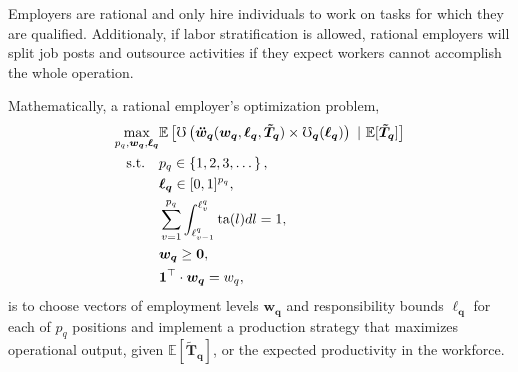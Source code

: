 \documentclass[hidelinks, nonatbib]{elsarticle}
\begin{document}
\begin{axiom}
    \label{era}
    Employers are rational and only hire individuals to work on tasks for which they are qualified. Additionaly, if labor stratification is allowed, rational employers will split job posts and outsource activities if they expect workers cannot accomplish the whole operation.

    Mathematically, a rational employer's optimization problem,
    \begin{align}
        \max_{
            p_q,
            \boldsymbol{w_q},
            \boldsymbol{\ell_q}
        }
            &
            \mathbb{E}\left[
                \mho\left(
                    \boldsymbol{\ddot{w}_{q}}(
                        \boldsymbol{w_{q}},
                        \boldsymbol{\ell_{q}},
                        \boldsymbol{\tilde{T}_{q}}
                    )
                    \times
                    \boldsymbol{
                        \mho_q
                    }(
                        \boldsymbol{\ell_q}
                    )
                \right)
                \
                |
                \
                \mathbb{E}[
                    \boldsymbol{\tilde{T}_q}
                ]
            \right]
            \\
            \text{s.t.}
            \quad
            &
            p_q \in \left\{1, 2, 3, \dots\right\}
            ,
            \\
            &
            \boldsymbol{\ell_q} \in [0,1] ^ {p_q}
            ,
            \\
            &
            \sum_{v=1}^{p_q}{
                \int_{
                    \ell_{v-1}^{q}
                }^{
                    \ell_{v}^{q}
                }
                \text{ta}(l)dl
            }
            =
            1
            ,
            \\
            &
            \boldsymbol{w_{q}} \geq \boldsymbol{0}
            ,
            \\
            &
            \boldsymbol{1} ^ {\top}
            \cdot
            \boldsymbol{w_q}
            =
            w_q
            ,
    \end{align}
    is to choose vectors of employment levels $\boldsymbol{w_q}$ and responsibility bounds $\boldsymbol{\ell_q}$ for each of $p_q$ positions and implement a production strategy that maximizes operational output, given $\mathbb{E}[\boldsymbol{\tilde{T}_q}]$, or the expected productivity in the workforce.
\end{axiom}
\end{document}
